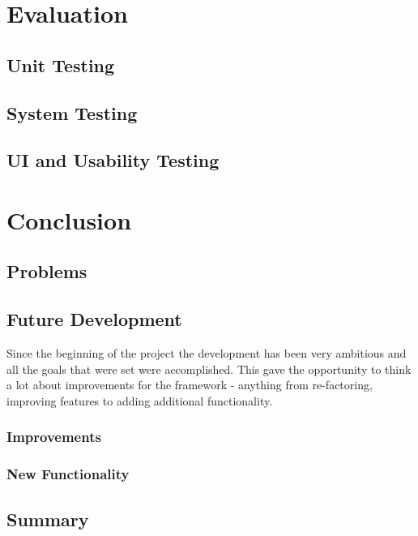 \documentclass{l4proj}
\begin{document}
\chapter{Evaluation}

\section{Unit Testing}

\section{System Testing}

\section{UI and Usability Testing}



\chapter{Conclusion}





\section{Problems}


\section{Future Development}
Since the beginning of the project the development has been very ambitious and all
the goals that were set were accomplished. This gave the opportunity to think a lot about
improvements for the framework - anything from re-factoring, improving features to adding
additional functionality.

\subsection{Improvements}


\subsection{New Functionality}


\section{Summary}






\end{document}
